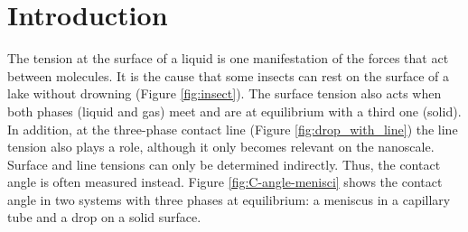 \section{Introduction}

The tension at the surface of a liquid is one manifestation of the
forces that act between molecules. It is the cause that some insects
can rest on the surface of a lake without drowning (Figure \ref{fig:insect}).
The surface tension also acts when both phases (liquid and gas) meet
and are at equilibrium with a third one (solid). In addition, at the
three-phase contact line (Figure \ref{fig:drop_with_line}) the line
tension also plays a role, although it only becomes relevant on the
nanoscale. Surface and line tensions can only be determined indirectly.
Thus, the contact angle is often measured instead. Figure \ref{fig:C-angle-menisci}
shows the contact angle in two systems with three phases at equilibrium:
a meniscus in a capillary tube and a drop on a solid surface.